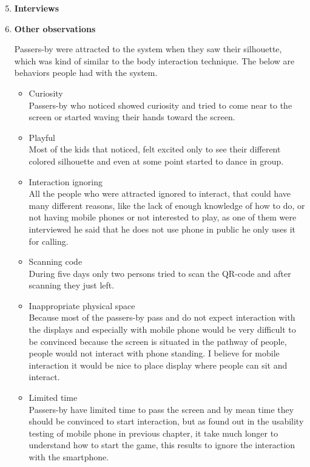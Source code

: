 \begin{enumerate}
\setcounter{enumi}{4}

\item \textbf{Interviews}



\newpage
\item \textbf{Other observations}

Passers-by were attracted to the system when they saw their silhouette, which was kind of similar to the body interaction technique. The below are behaviors people had with the system.

\begin{itemize}
\item Curiosity \\
Passers-by who noticed showed curiosity and tried to come near to the screen or started waving their hands toward the screen.
 

\item Playful   \\
Most of the kids that noticed, felt excited only to see their different colored silhouette and even at some point started to dance in group. 


\item Interaction ignoring \\
All the people who were attracted ignored to interact, that could have many different reasons, like the lack of enough knowledge of how to do, or not having mobile phones or not interested to play, as one of them were interviewed he said that he does not use phone in public he only uses it for calling. 

\item Scanning code \\ 
During five days only two persons tried to scan the QR-code and after scanning they just left.


\iffalse
\item Inappropriate physical space \\
Because most of the passers-by pass and do not expect interaction with the displays and especially with mobile phone would be very difficult to be convinced because the screen is situated in the pathway of people, people would not interact with phone standing. I believe for mobile interaction it would be nice to place display where people can sit and interact.

\item Limited time \\
Passers-by have limited time to pass the screen and by mean time they should be convinced to start interaction, but as found out in the usability testing of mobile phone in previous chapter, it take much longer to understand how to start the game, this results to ignore the interaction with the smartphone. 


\end{itemize}
\end{enumerate}

